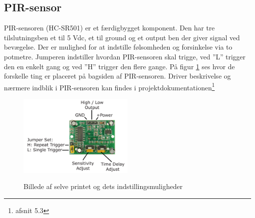 \subsection{PIR-sensor}

PIR-sensoren (HC-SR501) er et færdigbygget komponent. Den har tre tilslutningsben et til 5 Vdc, et til ground og et output ben der giver signal ved bevægelse. Der er mulighed for at indstille følsomheden og forsinkelse via to potmetre. Jumperen indstiller hvordan PIR-sensoren skal trigge, ved ''L'' trigger den en enkelt gang og ved ''H'' trigger den flere gange. På figur \ref{lab:pir_overview} ses hvor de forskelle ting er placeret på bagsiden af PIR-sensoren. Driver beskrivelse og nærmere indblik i PIR-sensoren kan findes i projektdokumentationen\footnote{afsnit 5.3}

\begin{figure}[H] \centering
{\includegraphics[width=0.5\textwidth]{Billeder/pir_overview}}
\caption{Billede af selve printet og dets indstillingsmuligheder}
\label{lab:pir_overview}
\raggedright
\end{figure}



